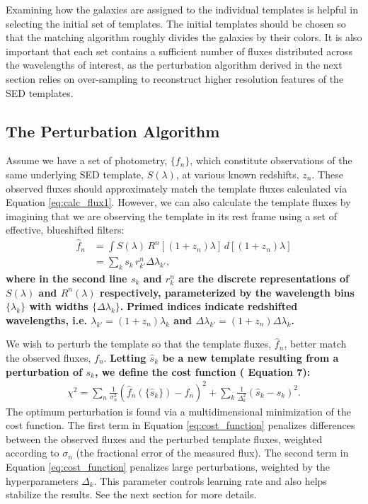 \documentclass[twocolumn]{aastex63}
\begin{document}
    Examining how the galaxies are assigned to the individual templates is helpful in selecting the initial set of templates.
    The initial templates should be chosen so that the matching algorithm roughly divides the galaxies by their colors.
    It is also important that each set contains a sufficient number of fluxes distributed across the wavelengths of interest, as the perturbation algorithm derived in the next section relies on over-sampling to reconstruct higher resolution features of the SED templates.



    \subsection{The Perturbation Algorithm}
    \label{sect:perturbation}

    Assume we have a set of photometry, $\{f_n\}$, which constitute observations of the same underlying SED template, $S(\lambda)$, at various known redshifts, $z_n$. 
    These observed fluxes should approximately match the template fluxes calculated via Equation \ref{eq:calc_flux1}. 
    However, we can also calculate the template fluxes by imagining that we are observing the template in its rest frame using a set of effective, blueshifted filters:
    \begin{align}
        \hat{f}_n &= \int S(\lambda) \, R^n[(1+z_n)\lambda] \, d[(1+z_n)\lambda] \\
                  &= \sum_k s_k \, r_{k'}^n \Delta\lambda_{k'}, \label{eq:calc_flux2}
    \end{align}
    \textbf{where in the second line $s_k$ and $r_k^n$ are the discrete representations of $S(\lambda)$ and $R^n(\lambda)$ respectively, parameterized by the wavelength bins $\{\lambda_k\}$ with widths $\{\Delta\lambda_k\}$.}
    \textbf{Primed indices indicate redshifted wavelengths, i.e. $\lambda_{k'} = (1+z_n) \lambda_k$ and $\Delta\lambda_{k'} = (1+z_n)\Delta\lambda_k$.}

    We wish to perturb the template so that the template fluxes, $\hat{f}_n$, better match the observed fluxes, $f_n$. 
    \textbf{Letting $\hat{s}_k$ be a new template resulting from a perturbation of $s_k$, we define the cost function (\citealt{Budavari2000b} Equation 7):}
    \begin{align}
        \chi^2 =
        \sum_n \frac{1}{\sigma_n^2}(\hat{f}_n(\{\hat{s}_k\}) - f_n)^2 + 
        \sum_k \frac{1}{\Delta_k^2}(\hat{s}_k - s_k)^2. \label{eq:cost_function}
    \end{align}
    The optimum perturbation is found via a multidimensional minimization of the cost function. 
    The first term in Equation \ref{eq:cost_function} penalizes differences between the observed fluxes and the perturbed template fluxes, weighted according to $\sigma_n$ (the fractional error of the measured flux).
    The second term in Equation \ref{eq:cost_function} penalizes large perturbations, weighted by the hyperparameters $\Delta_k$. 
    This parameter controls learning rate and also helps stabilize the results. 
    See the next section for more details. 
\end{document}
